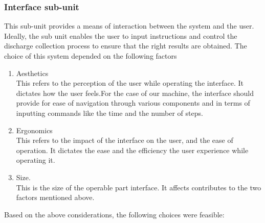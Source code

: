 \subsubsection{Interface sub-unit}
This sub-unit provides a means of interaction between the system and the user. Ideally, the sub unit enables the user to input instructions and control the discharge collection process to ensure that the right results are obtained. The choice of this system depended on  the following factors
\begin{enumerate}
    \item Aesthetics \\
    This refers to the perception of the user while operating the interface. It dictates how the user feels.For the case of our machine, the interface should provide for ease of navigation through various components and in terms of inputting commands like the time and the number of steps.
    \item Ergonomics \\
    This refers to the impact of the interface on the user, and the ease of operation. It dictates the ease and the efficiency the user experience while operating it.
    \item Size. \\
    This is the size of the operable part interface. It affects  contributes to the two factors mentioned above. 
\end{enumerate}
Based on the above considerations, the following choices were feasible:
